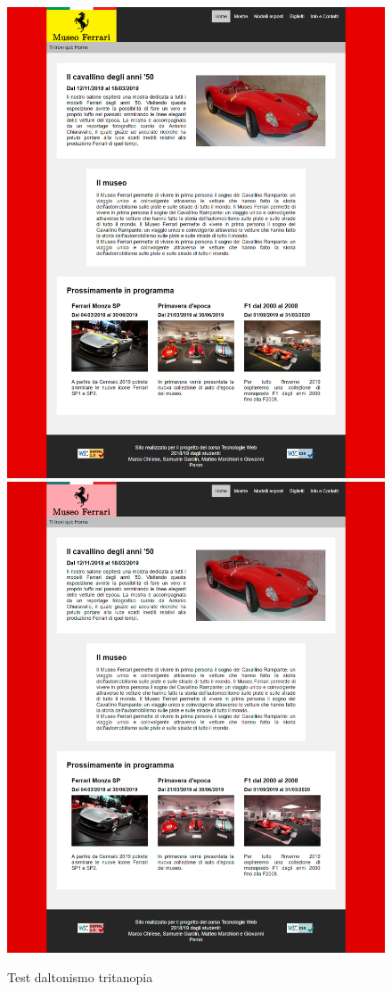 \begin{figure}[!h]
	\begin{center}
		\includegraphics[scale=0.144]{Images/original.png}
		\includegraphics[scale=0.6]{Images/tritanopia.png}
		\caption{Test daltonismo tritanopia}
	\end{center}
\end{figure}\\

